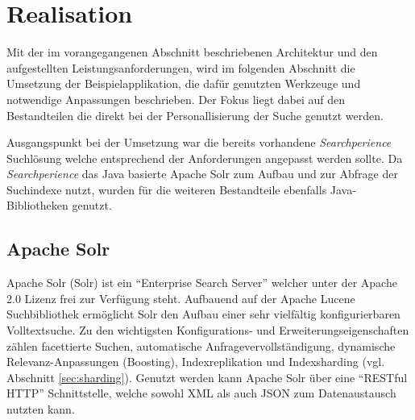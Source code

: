 \section{Realisation}

Mit der im vorangegangenen Abschnitt beschriebenen Architektur und den aufgestellten Leistungsanforderungen, wird im folgenden Abschnitt die Umsetzung der Beispielapplikation, die dafür genutzten Werkzeuge und notwendige Anpassungen beschrieben. Der Fokus liegt dabei auf den Bestandteilen die direkt bei der Personallisierung der Suche genutzt werden.

Ausgangspunkt bei der Umsetzung war die bereits vorhandene \textit{Searchperience} Suchlösung welche entsprechend der Anforderungen angepasst werden sollte. 
Da \textit{Searchperience} das Java basierte Apache Solr zum Aufbau und zur Abfrage der Suchindexe nutzt, wurden für die weiteren Bestandteile ebenfalls Java-Bibliotheken genutzt.

\subsection{Apache Solr}\label{sec:solr}

Apache Solr (Solr) ist ein ``Enterprise Search Server'' welcher unter der Apache 2.0 Lizenz frei zur Verfügung steht. Aufbauend auf der Apache Lucene Suchbibliothek ermöglicht Solr den Aufbau einer sehr vielfältig konfigurierbaren Volltextsuche. Zu den wichtigsten Konfigurations- und Erweiterungseigenschaften zählen facettierte Suchen, automatische Anfragevervollständigung, dynamische Relevanz-Anpassungen (Boosting), Indexreplikation und Indexsharding (vgl. Abschnitt \ref{sec:sharding}). Genutzt werden kann Apache Solr über eine ``RESTful HTTP'' Schnittstelle, welche sowohl XML als auch JSON zum Datenaustausch nutzten kann. 


